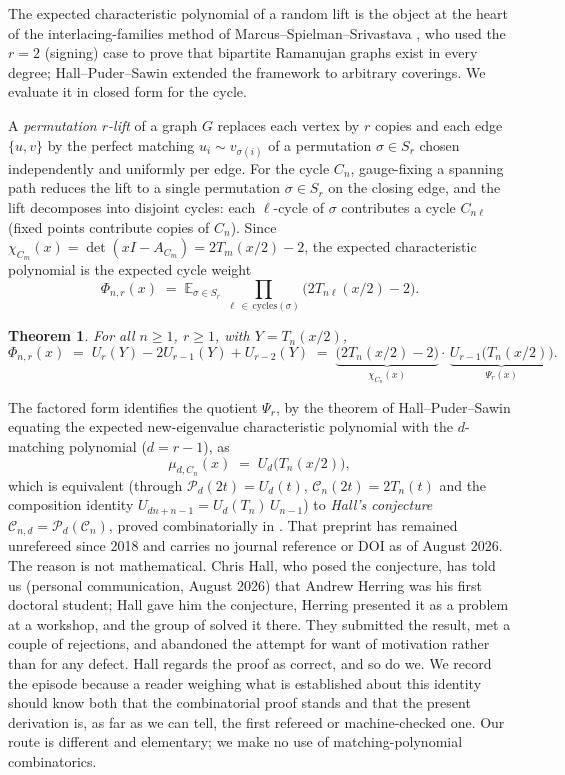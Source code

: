 \documentclass[11pt]{article}
\newtheorem{theorem}{Theorem}
\theoremstyle{remark}
\newcommand{\E}{\mathbb{E}}
\begin{document}
The expected characteristic polynomial of a random lift is the object at the
heart of the interlacing-families method of Marcus--Spielman--Srivastava
\cite{MSS}, who used the $r=2$ (signing) case to prove that bipartite Ramanujan
graphs exist in every degree; Hall--Puder--Sawin \cite{HPS} extended the
framework to arbitrary coverings. We evaluate it in closed form for the cycle.

A \emph{permutation $r$-lift} of a graph $G$ replaces each vertex by $r$
copies and each edge $\{u,v\}$ by the perfect matching $u_i\sim v_{\sigma(i)}$
of a permutation $\sigma\in S_r$ chosen independently and uniformly per edge.
For the cycle $C_n$, gauge-fixing a spanning path reduces the lift to a single
permutation $\sigma\in S_r$ on the closing edge, and the lift decomposes into
disjoint cycles: each $\ell$-cycle of $\sigma$ contributes a cycle $C_{n\ell}$
(fixed points contribute copies of $C_n$). Since
$\chi_{C_m}(x)=\det(xI-A_{C_m})=2T_m(x/2)-2$, the expected characteristic
polynomial is the expected cycle weight
\begin{equation}\label{eq:avg}
\Phi_{n,r}(x)\;=\;\E_{\sigma\in S_r}\;
\prod_{\ell\,\in\,\mathrm{cycles}(\sigma)}\bigl(2T_{n\ell}(x/2)-2\bigr).
\end{equation}

\begin{theorem}\label{thm:main}
For all $n\ge 1$, $r\ge 1$, with $Y=T_n(x/2)$,
\[
\Phi_{n,r}(x)\;=\;U_r(Y)-2U_{r-1}(Y)+U_{r-2}(Y)
\;=\;\underbrace{\bigl(2T_n(x/2)-2\bigr)}_{\chi_{C_n}(x)}\cdot\,
\underbrace{U_{r-1}\bigl(T_n(x/2)\bigr)}_{\Psi_r(x)} .
\]
\end{theorem}

The factored form identifies the quotient $\Psi_r$, by the theorem of
Hall--Puder--Sawin \cite{HPS} equating the expected new-eigenvalue
characteristic polynomial with the $d$-matching polynomial ($d=r-1$), as
\[
\mu_{d,C_n}(x)\;=\;U_{d}\bigl(T_n(x/2)\bigr),
\]
which is equivalent (through $\mathcal P_d(2t)=U_d(t)$, $\mathcal
C_n(2t)=2T_n(t)$ and the composition identity
$U_{dn+n-1}=U_d(T_n)\,U_{n-1}$) to \emph{Hall's conjecture}
$\mathcal C_{n,d}=\mathcal P_d(\mathcal C_n)$, proved combinatorially in \cite{CGHRS}.
That preprint has remained unrefereed since 2018 and carries no journal reference or
DOI as of August 2026. The reason is not mathematical. Chris Hall, who posed the
conjecture, has told us (personal communication, August 2026) that Andrew Herring was his
first doctoral student; Hall gave him the conjecture, Herring presented it as a problem at
a workshop, and the group of \cite{CGHRS} solved it there. They submitted the result, met
a couple of rejections, and abandoned the attempt for want of motivation rather than for
any defect. Hall regards the proof as correct, and so do we. We record the episode because
a reader weighing what is established about this identity should know both that the
combinatorial proof stands and that the present derivation is, as far as we can tell, the
first refereed or machine-checked one.
Our route is different and elementary; we make no use of matching-polynomial
combinatorics.
\end{document}
